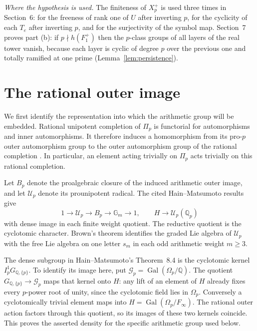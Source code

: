 \documentclass[11pt]{article}
\theoremstyle{definition}
\numberwithin{equation}{section}
\begin{document}
\emph{Where the hypothesis is used.} The finiteness of $X_p^+$ is used three times in Section~6: for the
freeness of rank one of $U$ after inverting $p$, for the cyclicity of each $T_e$ after inverting $p$, and for the
surjectivity of the symbol map. Section~7 proves part (b): if $p\nmid h(F_1^+)$ then the $p$-class groups of all
layers of the real tower vanish, because each layer is cyclic of degree $p$ over the previous one and totally
ramified at one prime (Lemma~\ref{lem:persistence}).

\section{The rational outer image}
\label{sec:rational-image}

We first identify the representation into which the arithmetic group
will be embedded. Rational unipotent completion of $\Pi_p$ is
functorial for automorphisms and inner automorphisms. It therefore
induces a homomorphism from its pro-$p$ outer automorphism group to
the outer automorphism group of the rational completion
\cite[Appendix A.6, A.9--A.10]{HainMatsumoto2001}.
In particular, an element acting trivially on $\Pi_p$ acts trivially
on this rational completion.

Let $B_p$ denote the proalgebraic closure of the induced arithmetic
outer image, and let $\mathcal U_p$ denote its prounipotent radical.
The cited Hain--Matsumoto results give
\begin{equation}
 1\longrightarrow\mathcal U_p\longrightarrow B_p
   \longrightarrow\mathbb G_m\longrightarrow1,
 \qquad H\longrightarrow\mathcal U_p(\mathbb Q_p)
\end{equation}
with dense image in each finite weight quotient. The reductive
quotient is the cyclotomic character. Brown's theorem \cite{Brown2012} identifies
the graded Lie algebra of $\mathcal U_p$ with the free Lie algebra
on one letter $s_m$ in each odd arithmetic weight $m\ge3$.

The dense subgroup in Hain--Matsumoto's Theorem~8.4 is the
cyclotomic kernel $I_p^1G_{\mathbb Q,\{p\}}$. To identify its image
here, put $\mathcal G_p=\operatorname{Gal}(\Omega_p/\mathbb Q)$.
The quotient $G_{\mathbb Q,\{p\}}\to\mathcal G_p$ maps that kernel
onto $H$: any lift of an element of $H$ already fixes every
$p$-power root of unity, since the cyclotomic field lies in
$\Omega_p$. Conversely a cyclotomically trivial element maps into
$H=\operatorname{Gal}(\Omega_p/F_\infty)$.
The rational outer action factors through this quotient, so its
images of these two kernels coincide. This proves the asserted
density for the specific arithmetic group used below.
\end{document}

